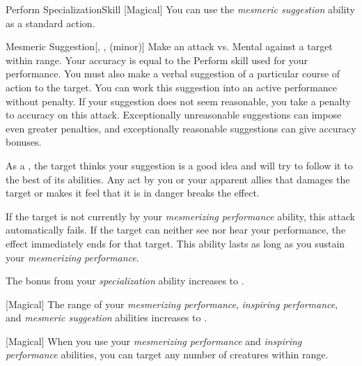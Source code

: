 \begin{feat}{Perform Specialization}{Skill}
        [Magical] You can use the \textit{mesmeric suggestion} ability as a standard action.
        \begin{apability}{Mesmeric Suggestion}[, ,  (minor)]
            Make an attack vs. Mental against a target within \rngmed range.
            Your accuracy is equal to the Perform skill used for your performance.
            You must also make a verbal suggestion of a particular course of action to the target.
            You can work this suggestion into an active performance without penalty.
            If your suggestion does not seem reasonable, you take a  penalty to accuracy on this attack.
            Exceptionally unreasonable suggestions can impose even greater penalties, and exceptionally reasonable suggestions can give accuracy bonuses.

            \hit As a , the target thinks your suggestion is a good idea and will try to follow it to the best of its abilities.
            Any act by you or your apparent allies that damages the target or makes it feel that it is in danger breaks the effect.

            If the target is not currently \fascinated by your \textit{mesmerizing performance} ability, this attack automatically fails.
            If the target can neither see nor hear your performance, the effect immediately ends for that target.
            This ability lasts as long as you sustain your \textit{mesmerizing performance}.
        \end{apability}

         The bonus from your \textit{specialization} ability increases to .

        [Magical] The range of your \textit{mesmerizing performance}, \textit{inspiring performance}, and \textit{mesmeric suggestion} abilities increases to \rnglong.

        [Magical] When you use your \textit{mesmerizing performance} and \textit{inspiring performance} abilities, you can target any number of creatures within range.
    \end{feat}


